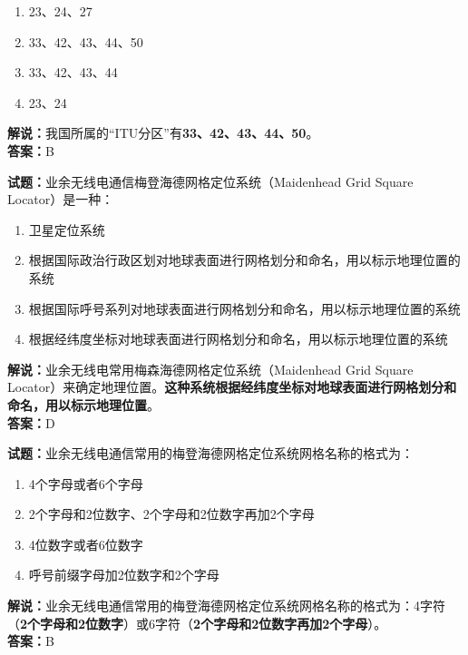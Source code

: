 \documentclass{ctexbook}
\begin{document}
\begin{enumerate}[leftmargin=3em]
	\item 23、24、27
	\item 33、42、43、44、50
	\item 33、42、43、44
	\item 23、24
\end{enumerate}

\noindent\textbf{解说：}我国所属的“ITU分区”有\textbf{33、42、43、44、50}。\\\noindent\textbf{答案：}B


\bigskip


\noindent\textbf{试题：}业余无线电通信梅登海德网格定位系统（Maidenhead Grid Square Locator）是一种：

\begin{enumerate}[leftmargin=3em]
	\item 卫星定位系统
	\item 根据国际政治行政区划对地球表面进行网格划分和命名，用以标示地理位置的系统
	\item 根据国际呼号系列对地球表面进行网格划分和命名，用以标示地理位置的系统
	\item 根据经纬度坐标对地球表面进行网格划分和命名，用以标示地理位置的系统
\end{enumerate}

\noindent\textbf{解说：}业余无线电常用梅森海德网格定位系统（Maidenhead Grid Square Locator）来确定地理位置。\textbf{这种系统根据经纬度坐标对地球表面进行网格划分和命名，用以标示地理位置}。\\\noindent\textbf{答案：}D


\bigskip


\noindent\textbf{试题：}业余无线电通信常用的梅登海德网格定位系统网格名称的格式为：

\begin{enumerate}[leftmargin=3em]
	\item 4个字母或者6个字母
	\item 2个字母和2位数字、2个字母和2位数字再加2个字母
	\item 4位数字或者6位数字
	\item 呼号前缀字母加2位数字和2个字母
\end{enumerate}

\noindent\textbf{解说：}业余无线电通信常用的梅登海德网格定位系统网格名称的格式为：4字符（\textbf{2个字母和2位数字}）或6字符（\textbf{2个字母和2位数字再加2个字母}）。\\\noindent\textbf{答案：}B


\bigskip
\end{document}

